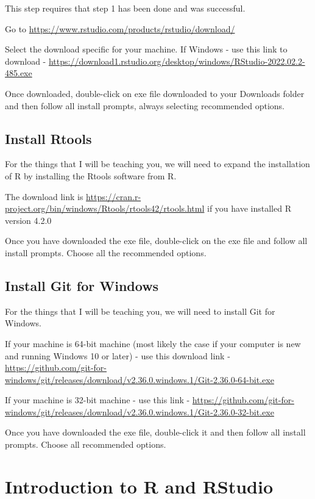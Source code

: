 \documentclass[
  12pt,
]{book}
\begin{document}
This step requires that step 1 has been done and was successful.

Go to \url{https://www.rstudio.com/products/rstudio/download/}

Select the download specific for your machine. If Windows - use this link to download - \url{https://download1.rstudio.org/desktop/windows/RStudio-2022.02.2-485.exe}

Once downloaded, double-click on exe file downloaded to your Downloads folder and then follow all install prompts, always selecting recommended options.

\hypertarget{install-rtools}{%
\section{Install Rtools}\label{install-rtools}}

For the things that I will be teaching you, we will need to expand the installation of R by installing the Rtools software from R.

The download link is \url{https://cran.r-project.org/bin/windows/Rtools/rtools42/rtools.html} if you have installed R version 4.2.0

Once you have downloaded the exe file, double-click on the exe file and follow all install prompts. Choose all the recommended options.

\hypertarget{install-git-for-windows}{%
\section{Install Git for Windows}\label{install-git-for-windows}}

For the things that I will be teaching you, we will need to install Git for Windows.

If your machine is 64-bit machine (most likely the case if your computer is new and running Windows 10 or later) - use this download link - \url{https://github.com/git-for-windows/git/releases/download/v2.36.0.windows.1/Git-2.36.0-64-bit.exe}

If your machine is 32-bit machine - use this link - \url{https://github.com/git-for-windows/git/releases/download/v2.36.0.windows.1/Git-2.36.0-32-bit.exe}

Once you have downloaded the exe file, double-click it and then follow all install prompts. Choose all recommended options.

\hypertarget{intro-r}{%
\chapter{Introduction to R and RStudio}\label{intro-r}}
\end{document}
